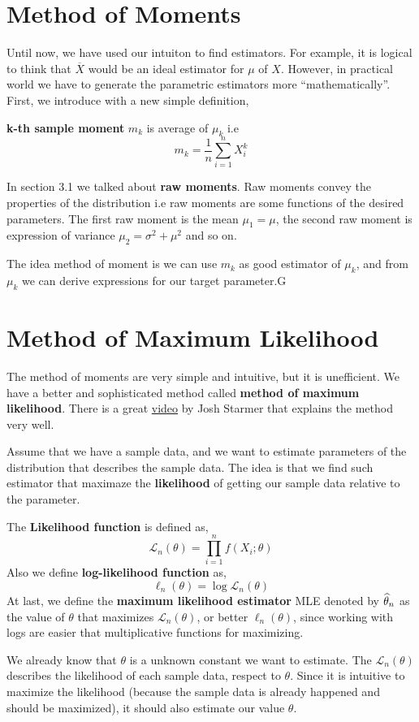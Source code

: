\section{Method of Moments}
Until now, we have used our intuiton to find estimators. For example, it is logical to think that $\overline{X}$ would be an ideal estimator for $\mu$ of $X$. However, in practical world we have to generate the parametric estimators more ``mathematically''.
First, we introduce with a new simple definition,
\begin{definition}
    \textbf{k-th sample moment} $m_k$ is average of $\mu_{k}$ i.e 
    \[m_k = \frac{1}{n} \sum_{i = 1}^n X_{i}^k \]
\end{definition}
In section 3.1 we talked about \textbf{raw moments}. Raw moments convey the properties of the distribution i.e raw moments are some functions of the desired parameters. The first raw moment is the mean $\mu_1 = \mu$, the second raw moment is expression of variance  $\mu_{2}= \sigma^2+ \mu^2$ and so on.

The idea method of moment is  we can use $m_k$ as good estimator of $\mu_k$, and from $\mu_k$ we can derive expressions for our target parameter.G
\section{Method of Maximum Likelihood}
The method of moments are very simple and intuitive, but it is unefficient. We have a better and sophisticated method called 
\textbf{method of maximum likelihood}. There is a great \href{https://www.youtube.com/watch?v=XepXtl9YKwc}{video}  by Josh Starmer that explains the method very well.

Assume that we have a sample data, and we want to estimate parameters of the distribution that describes the sample data. The idea is that we find such estimator that maximaze the \textbf{likelihood} of getting our sample data relative to the parameter.
\begin{definition}
    The \textbf{Likelihood function} is defined as,
    \[ \mathcal{L}_n(\theta) = \prod_{i=1}^n f(X_i; \theta) \]
    Also we define \textbf{log-likelihood function} as,
    \[\ell_n( \theta) = \log \mathcal{L}_n(\theta) \]
    At last, we define the \textbf{maximum likelihood estimator} MLE denoted by ${\widehat{\theta}}_n$ as the value of $\theta$ that maximizes $\mathcal{L}_n(\theta)$, or better $\ell_n( \theta)$, since working with logs are easier that multiplicative functions for maximizing.
\end{definition}
We already know that $\theta$ is a unknown constant we want to estimate. The $\mathcal{L}_n(\theta)$ describes the likelihood of each sample data, respect to $\theta$. Since it is intuitive to maximize the likelihood (because the sample data is already happened and should be maximized), it should also estimate our value $\theta$.


